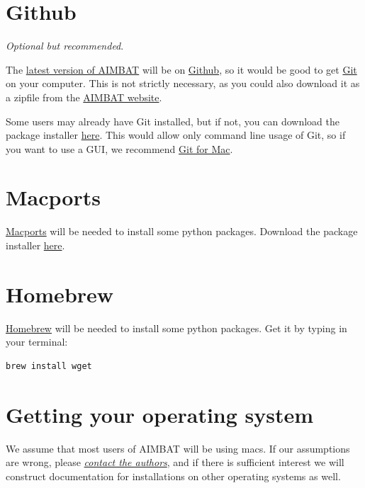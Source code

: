 \documentclass[letterpaper,10pt,english]{sphinxmanual}
\begin{document}
\section{Github}
\label{docfiles/install_dependencies:github}
\emph{Optional but recommended}.

The \href{https://github.com/pysmo}{latest version of AIMBAT} will be on \href{https://github.com/}{Github}, so it would be good to get \href{https://github.com/}{Git} on your computer. This is not strictly necessary, as you could also download it as a zipfile from the \href{http://www.earth.northwestern.edu/~xlou/aimbat.html}{AIMBAT website}.

Some users may already have Git installed, but if not, you can download the package installer \href{http://git-scm.com/download/mac}{here}. This would allow only command line usage of Git, so if you want to use a GUI, we recommend \href{https://mac.github.com/}{Git for Mac}.


\section{Macports}
\label{docfiles/install_dependencies:macports}
\href{http://www.macports.org/}{Macports} will be needed to install some python packages. Download the package installer \href{http://www.macports.org/install.php}{here}.


\section{Homebrew}
\label{docfiles/install_dependencies:homebrew}
\href{http://brew.sh/}{Homebrew} will be needed to install some python packages. Get it by typing in your terminal:

\begin{Verbatim}[commandchars=\\\{\}]
brew install wget
\end{Verbatim}


\section{Getting your operating system}
\label{docfiles/install_dependencies:getting-your-operating-system}
We assume that most users of AIMBAT will be using macs. If our assumptions are wrong, please {\hyperref[docfiles/introduction:authors-contacts]{\emph{contact the authors}}}, and if there is sufficient interest we will construct documentation for installations on other operating systems as well.
\end{document}
